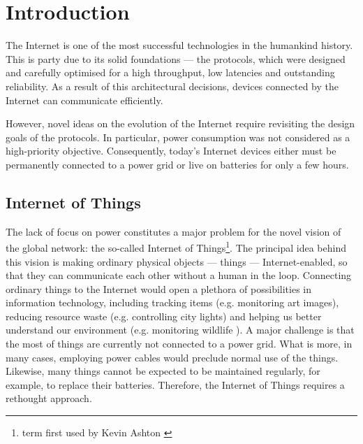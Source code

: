 \chapter{Introduction}

The Internet is one of the most successful technologies in the humankind history.
This is party due to its solid foundations --- the protocols, which were designed and carefully optimised for a high throughput, low latencies and outstanding reliability.
As a result of this architectural decisions, devices connected by the Internet can communicate efficiently.

However, novel ideas on the evolution of the Internet require revisiting the design goals of the protocols.
In particular, power consumption was not considered as a high-priority objective.
Consequently, today's Internet devices either must be permanently connected to a power grid or live on batteries for only a few hours.

\section{Internet of Things}

The lack of focus on power constitutes a major problem for the novel vision of the global network: the so-called Internet of Things\footnote{term first used by Kevin Ashton \cite{InternetOfThings}}.
The principal idea behind this vision is making ordinary physical objects --- things --- Internet-enabled, so that they can communicate each other without a human in the loop.
Connecting ordinary things to the Internet would open a plethora of possibilities in information technology, including tracking items (e.g. monitoring art images), reducing resource waste (e.g. controlling city lights) and helping us better understand our environment (e.g. monitoring wildlife \cite{liu2009long}).
A major challenge is that the most of things are currently not connected to a power grid.
What is more, in many cases, employing power cables would preclude normal use of the things.
Likewise, many things cannot be expected to be maintained regularly, for example, to replace their batteries.
Therefore, the Internet of Things requires a rethought approach.


